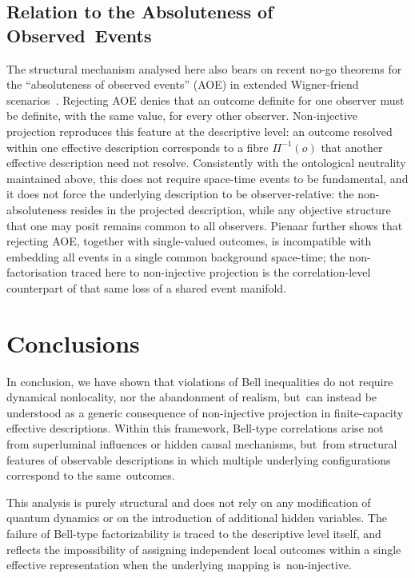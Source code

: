 \documentclass[11pt,a4paper]{article}
\theoremstyle{remark}
\begin{document}
  \subsection{Relation to the Absoluteness of Observed~Events}
    The structural mechanism analysed here also bears on recent no-go theorems for the
    ``absoluteness of observed events'' (AOE) in extended Wigner-friend scenarios~\cite{Pienaar2026}.
    Rejecting AOE denies that an outcome definite for one observer must be definite, with the same value,
    for every other observer.
    Non-injective projection reproduces this feature at the descriptive level: an outcome resolved within
    one effective description corresponds to a fibre $\Pi^{-1}(o)$ that another effective description need
    not resolve.
    Consistently with the ontological neutrality maintained above, this does not require space-time events
    to be fundamental, and it does not force the underlying description to be observer-relative: the
    non-absoluteness resides in the projected description, while any objective structure that one may posit
    remains common to all observers.
    Pienaar further shows that rejecting AOE, together with single-valued outcomes, is incompatible with
    embedding all events in a single common background space-time; the non-factorisation traced here to
    non-injective projection is the correlation-level counterpart of that same loss of a shared event
    manifold.

  \section{Conclusions}
  \label{sec:conclusion}

  In conclusion, we have shown that violations of Bell inequalities do not require
  dynamical nonlocality, nor the abandonment of realism, but~can instead be understood
  as a generic consequence of non-injective projection in finite-capacity effective
  descriptions.
  Within this framework, Bell-type correlations arise not from superluminal influences
  or hidden causal mechanisms, but~from structural features of observable descriptions
  in which multiple underlying configurations correspond to the same~outcomes.

  This analysis is purely structural and does not rely on any modification of quantum
  dynamics or on the introduction of additional hidden variables.
  The failure of Bell-type factorizability is traced to the descriptive level itself,
  and reflects the impossibility of assigning independent local outcomes within a
  single effective representation when the underlying mapping is~non-injective.
\end{document}
